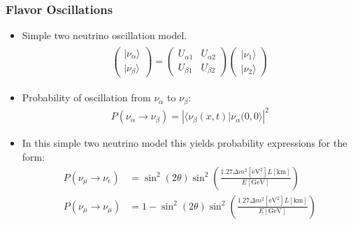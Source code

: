 \documentclass[mathserif,18pt,xcolor=table]{beamer}
\begin{document}
\begin{frame}
  \frametitle{Flavor Oscillations}
  \begin{itemize}
    \item Simple two neutrino oscillation model.
    \begin{align}
      \begin{split}
        \begin{pmatrix}
          |\nu_\alpha\rangle \\
          |\nu_\beta\rangle
        \end{pmatrix} = 
        \begin{pmatrix}
          U_{\alpha 1} & U_{\alpha 2} \\
          U_{\beta  1} & U_{\beta  2}
        \end{pmatrix}
        \begin{pmatrix}
          |\nu_1\rangle \\
          |\nu_2\rangle
        \end{pmatrix}
      \end{split}
    \end{align}
  \item Probability of oscillation from $\nu_\alpha$ to $\nu_\beta$:
    \begin{align}
      P(\nu_\alpha \rightarrow \nu_\beta) = \left|\langle \nu_\beta(x,t)|\nu_\alpha(0,0\rangle\right|^2
    \end{align}
  \item In this simple two neutrino model this yields probability expressions for the form:
    \begin{align}
      P(\nu_\mu\rightarrow\nu_e)   &= \sin^2(2\theta) \sin^2\left(\frac{1.27\Delta m^2[\text{eV}^2] L[\text{km}]}{E[\text{GeV}]}\right) \\
      P(\nu_\mu\rightarrow\nu_\mu) &= 1 - \sin^2(2\theta) \sin^2\left(\frac{1.27\Delta m^2[\text{eV}^2] L[\text{km}]}{E[\text{GeV}]}\right)
    \end{align}
  \end{itemize}
\end{frame}
\end{document}
